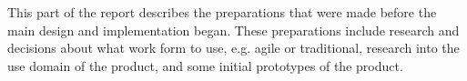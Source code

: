 This part of the report describes the preparations that were made before the main design and implementation began. 
These preparations include research and decisions about what work form to use, e.g. agile or traditional, research into the use domain of the product, and some initial prototypes of the product. 